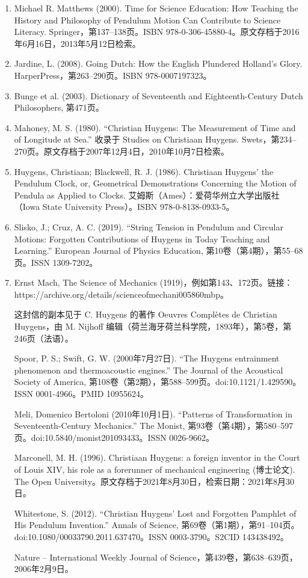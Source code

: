 \begin{enumerate}
\item Michael R. Matthews (2000). Time for Science Education: How Teaching the History and Philosophy of Pendulum Motion Can Contribute to Science Literacy. Springer，第137–138页。ISBN 978-0-306-45880-4。原文存档于2016年6月16日，2013年5月12日检索。
\item Jardine, L. (2008). Going Dutch: How the English Plundered Holland's Glory. HarperPress，第263–290页。ISBN 978-0007197323。
\item Bunge et al. (2003). Dictionary of Seventeenth and Eighteenth-Century Dutch Philosophers, 第471页。
\item Mahoney, M. S. (1980). “Christian Huygens: The Measurement of Time and of Longitude at Sea.” 收录于 Studies on Christiaan Huygens. Swets，第234–270页。原文存档于2007年12月4日，2010年10月7日检索。
\item Huygens, Christiaan; Blackwell, R. J. (1986). Christiaan Huygens' the Pendulum Clock, or, Geometrical Demonstrations Concerning the Motion of Pendula as Applied to Clocks. 艾姆斯（Ames）：爱荷华州立大学出版社（Iowa State University Press）。ISBN 978-0-8138-0933-5。
\item Slisko, J.; Cruz, A. C. (2019). “String Tension in Pendulum and Circular Motions: Forgotten Contributions of Huygens in Today Teaching and Learning.” European Journal of Physics Education, 第10卷（第4期），第55–68页。ISSN 1309-7202。
\item Ernst Mach, The Science of Mechanics (1919)，例如第143、172页。链接：https://archive.org/details/scienceofmechani005860mbp。

这封信的副本见于 C. Huygens 的著作 Oeuvres Complètes de Christian Huygens，由 M. Nijhoff 编辑（荷兰海牙荷兰科学院，1893年），第5卷，第246页（法语）。

Spoor, P. S.; Swift, G. W. (2000年7月27日). “The Huygens entrainment phenomenon and thermoacoustic engines.” The Journal of the Acoustical Society of America, 第108卷（第2期），第588–599页。doi:10.1121/1.429590。ISSN 0001-4966。PMID 10955624。

Meli, Domenico Bertoloni (2010年10月1日). “Patterns of Transformation in Seventeenth-Century Mechanics.” The Monist, 第93卷（第4期），第580–597页。doi:10.5840/monist201093433。ISSN 0026-9662。

Marconell, M. H. (1996). Christiaan Huygens: a foreign inventor in the Court of Louis XIV, his role as a forerunner of mechanical engineering (博士论文). The Open University。原文存档于2021年8月30日，检索日期：2021年8月30日。

Whitestone, S. (2012). “Christian Huygens' Lost and Forgotten Pamphlet of His Pendulum Invention.” Annals of Science, 第69卷（第1期），第91–104页。doi:10.1080/00033790.2011.637470。ISSN 0003-3790。S2CID 143438492。

Nature – International Weekly Journal of Science，第439卷，第638–639页，2006年2月9日。






\end{enumerate}


